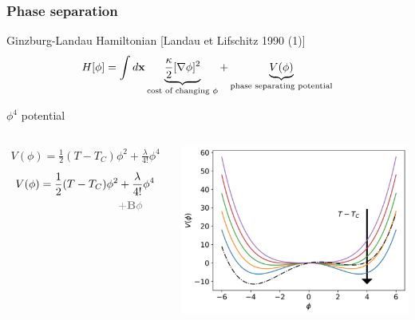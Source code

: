 \documentclass[9pt, dvipsnames]{beamer} %
\newcommand{\nn}{\nonumber \\} %
\newcommand{\bx}{{\bf x}} %
\begin{document}
\begin{frame}
    \frametitle{Phase separation}
        \begin{block}{Ginzburg-Landau Hamiltonian [Landau et Lifschitz 1990 (1)]} 
        \begin{align}
            H[\phi] = \int d\bx  \underbrace{\frac{\kappa}{2}[\nabla \phi]^2}_{\text{cost of changing $\phi$}} + \underbrace{V(\phi)}_{\text{phase separating potential}}
        \end{align}
       	\end{block}

       	\begin{block}{$\phi^4$ potential}
			\begin{columns}
			\begin{overprint}
       		\begin{align}
       			V(\phi) = \frac{1}{2} (T-T_C) \phi^2 + \frac{\lambda}{4!} \phi^4
       		\end{align}
       		\onslide<2>
       		\begin{align}
       			V(\phi) = \frac{1}{2} (T-T_C) \phi^2 &+ \frac{\lambda}{4!} \phi^4 \nn 
       			&{\color{gray} \bf + B \phi}
       		\end{align}       		
       		\end{overprint}
       		
       	\centering
        \includegraphics[width=\linewidth]{double-puit-en-fonction-temp.pdf}
        \end{columns}
       	\end{block}        
\end{frame}
\end{document}
